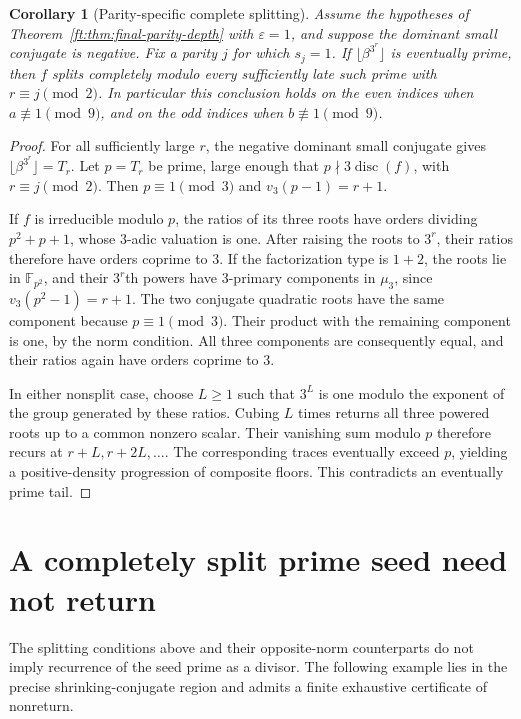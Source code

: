 \documentclass[11pt,a4paper]{article}
\newtheorem{corollary}[theorem]{Corollary}
\theoremstyle{definition}
\theoremstyle{remark}
\numberwithin{equation}{section}
\begin{document}
\begin{corollary}[Parity-specific complete splitting]
\label{ft:cor:final-parity-splitting}
Assume the hypotheses of Theorem~\ref{ft:thm:final-parity-depth}
with $\varepsilon=1$, and suppose the dominant small conjugate
is negative. Fix a parity $j$ for which $s_j=1$.
If $\lfloor\beta^{3^r}\rfloor$ is eventually prime, then $f$
splits completely modulo every sufficiently late such prime
with $r\equiv j\pmod2$.
In particular this conclusion holds on the even indices when
$a\not\equiv1\pmod9$, and on the odd indices when
$b\not\equiv1\pmod9$.
\end{corollary}
\begin{proof}
For all sufficiently large $r$, the negative dominant small
conjugate gives $\lfloor\beta^{3^r}\rfloor=T_r$.
Let $p=T_r$ be prime, large enough that
$p\nmid3\operatorname{disc}(f)$, with $r\equiv j\pmod2$.
Then $p\equiv1\pmod3$ and $v_3(p-1)=r+1$.

If $f$ is irreducible modulo $p$, the ratios of its three roots
have orders dividing $p^2+p+1$, whose $3$-adic valuation is one.
After raising the roots to $3^r$, their ratios therefore have
orders coprime to $3$. If the factorization type is $1+2$, the
roots lie in $\mathbb F_{p^2}$, and their $3^r$th powers have
$3$-primary components in $\mu_3$, since
$v_3(p^2-1)=r+1$. The two conjugate quadratic roots have the
same component because $p\equiv1\pmod3$. Their product with
the remaining component is one, by the norm condition.
All three components are consequently equal, and their ratios
again have orders coprime to $3$.

In either nonsplit case, choose $L\ge1$ such that $3^L$ is one
modulo the exponent of the group generated by these ratios.
Cubing $L$ times returns all three powered roots up to a common
nonzero scalar. Their vanishing sum modulo $p$ therefore
recurs at $r+L,r+2L,\ldots$. The corresponding traces eventually
exceed $p$, yielding a positive-density progression of composite
floors. This contradicts an eventually prime tail.
\end{proof}


\section{A completely split prime seed need not return}
\label{ft:sec:final-cubic-return}

The splitting conditions above and their opposite-norm counterparts
do not imply recurrence of the seed prime as a divisor. The following
example lies in the precise shrinking-conjugate region and admits a
finite exhaustive certificate of nonreturn.
\end{document}
